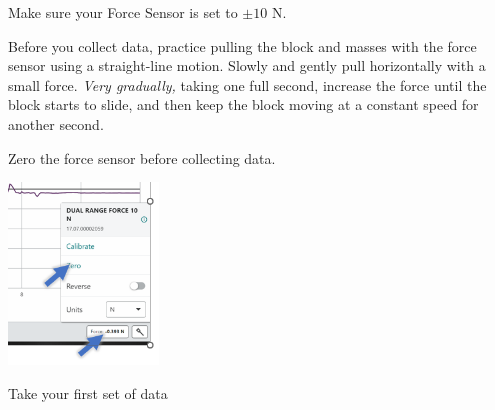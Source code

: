 \documentclass[10pt]{exam}
\begin{document}
\begin{questions}
  \question
    Make sure your Force Sensor is set to $\pm 10$ N.

  \question 
    Before you collect data, practice pulling the block and masses with the force sensor using a straight-line motion. Slowly and gently pull horizontally with a small force. \emph{Very gradually,} taking one full second, increase the force until the block starts to slide, and then keep the block moving at a constant speed for another second.




  \question 
    Zero the force sensor before collecting data.

    \begin{minipage}[b]{10cm}
      \vspace{6em}
    \end{minipage}
    \hfill
    \includegraphics[width=4cm]{zero}
      


  \question
    Take your first set of data
  
\end{questions}
\end{document}
